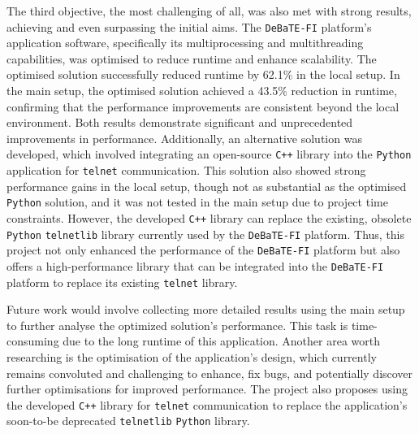 The third objective, the most challenging of all, was also met with strong results, achieving and even surpassing the initial aims. The \texttt{DeBaTE-FI} platform's application software, specifically its multiprocessing and multithreading capabilities, was optimised to reduce runtime and enhance scalability. The optimised solution successfully reduced runtime by 62.1\% in the local setup. In the main setup, the optimised solution achieved a 43.5\% reduction in runtime, confirming that the performance improvements are consistent beyond the local environment. Both results demonstrate significant and unprecedented improvements in performance. Additionally, an alternative solution was developed, which involved integrating an open-source \texttt{C++} library into the \texttt{Python} application for \texttt{telnet} communication. This solution also showed strong performance gains in the local setup, though not as substantial as the optimised \texttt{Python} solution, and it was not tested in the main setup due to project time constraints. However, the developed \texttt{C++} library can replace the existing, obsolete \texttt{Python} \texttt{telnetlib} library currently used by the \texttt{DeBaTE-FI} platform. Thus, this project not only enhanced the performance of the \texttt{DeBaTE-FI} platform but also offers a high-performance library that can be integrated into the \texttt{DeBaTE-FI} platform to replace its existing \texttt{telnet} library.

Future work would involve collecting more detailed results using the main setup to further analyse the optimized solution's performance. This task is time-consuming due to the long runtime of this application. Another area worth researching is the optimisation of the application's design, which currently remains convoluted and challenging to enhance, fix bugs, and potentially discover further optimisations for improved performance. The project also proposes using the developed \texttt{C++} library for \texttt{telnet} communication to replace the application's soon-to-be deprecated \texttt{telnetlib} \texttt{Python} library.
